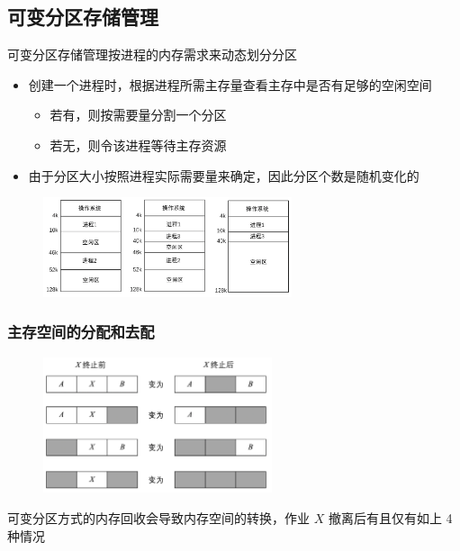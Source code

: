 \documentclass[cs4size,a4paper,10pt]{ctexart}
\begin{document}
		\subsection{可变分区存储管理}
		可变分区存储管理按进程的内存需求来动态划分分区
		\begin{itemize}
			\item 创建一个进程时，根据进程所需主存量查看主存中是否有足够的空闲空间
			\begin{itemize}
				\item 若有，则按需要量分割一个分区
				\item 若无，则令该进程等待主存资源
			\end{itemize}
			\item 由于分区大小按照进程实际需要量来确定，因此分区个数是随机变化的
		\end{itemize}
		\begin{figure}[H]
			\centering
			\includegraphics[width=0.65\textwidth]{img/3.2.3}
		\end{figure}
		
		\subsubsection{主存空间的分配和去配}
		\begin{figure}[H]
			\centering
			\includegraphics[width=0.6\textwidth]{img/3.2.3.1}
		\end{figure}

		可变分区方式的内存回收会导致内存空间的转换，作业 $X$ 撤离后有且仅有如上 4 种情况
\end{document}
